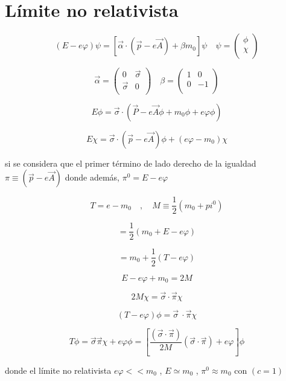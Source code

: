 \documentclass{report}
\begin{document}
\section{L\'imite no relativista}

\[(E-e \varphi)\psi = [ \overrightarrow{\alpha} \cdot (\overrightarrow{p}-e \overrightarrow{A} ) + \beta m_0 ] \psi \quad \psi = \left ( \begin{array}{cc}
 \phi  \\
 \chi \\ \end{array} \right) \]

\[\overrightarrow{\alpha} = \left ( \begin{array}{cc}
 0 & \overrightarrow{\sigma}  \\
 \overrightarrow{\sigma} & 0 \\ \end{array} \right) \quad \beta =  \left ( \begin{array}{cc}
 1 & 0  \\
 0 & -1 \\ \end{array} \right)\]

\[E \phi = \overrightarrow{ \sigma} \cdot (\overrightarrow{P}-e\overrightarrow{A} \phi + m_0 \phi + e \varphi \phi)\]

\[E \chi = \overrightarrow{\sigma} \cdot (\overrightarrow{p}-e\overrightarrow{A}) \phi + (e \varphi - m_0 ) \chi \]

si se considera que el primer término de lado derecho de la igualdad $\pi \equiv (\overrightarrow{p}-e\overrightarrow{A})$ donde además, $\pi^0 = E-e \varphi$

\[T = e-m_0 \quad , \quad M \equiv \frac{1}{2} (m_0 + pi^0 )\]

\[= \frac{1}{2} (m_0 + E- e \varphi )\]

\[= m_0 + \frac{1}{2} (T-e \varphi)\]

\[E-e \varphi + m_0 = 2M\]

\[2M \chi = \overrightarrow{\sigma} \cdot \overrightarrow{\pi} \chi \]

\[(T-e \varphi ) \phi = \overrightarrow{\sigma}\ \cdot \overrightarrow{\pi} \chi \]

\[T \phi = \overrightarrow{\sigma} \overrightarrow{\pi} \chi + e \varphi \phi = [\frac{(\overrightarrow{\sigma} \cdot \overrightarrow{\pi})}{2M} (\overrightarrow{\sigma} \cdot \overrightarrow{\pi}) + e \varphi ] \phi \]

donde el límite no relativista $e \varphi << m_0 $ , $E \simeq m_0 $ , $\pi^0 \approx m_0 $ con $(c = 1)$
\end{document}
